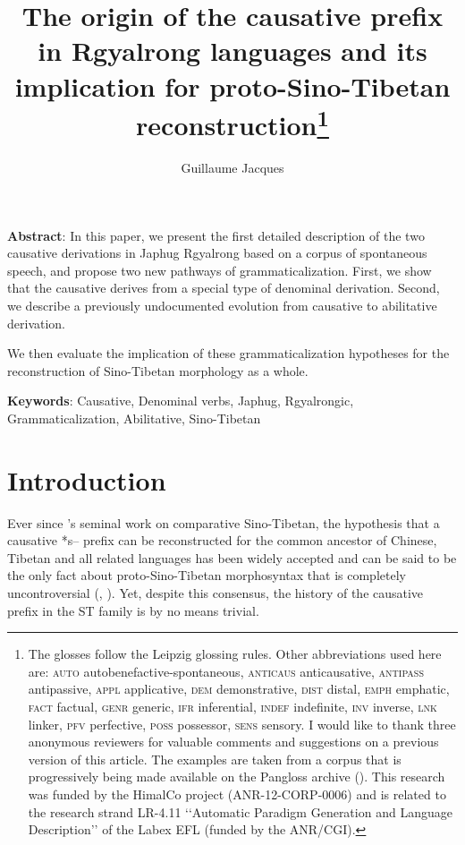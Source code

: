 \documentclass[oldfontcommands,oneside,a4paper,11pt]{article}
\begin{document}
 
\linenumbers
\title{The origin of the causative prefix in Rgyalrong languages and its implication for proto-Sino-Tibetan reconstruction\footnote{
The glosses follow the Leipzig glossing rules. Other abbreviations used here are: \textsc{auto}  autobenefactive-spontaneous, \textsc{anticaus} anticausative, \textsc{antipass} antipassive, \textsc{appl} applicative, \textsc{dem} demonstrative,  \textsc{dist} distal, \textsc{emph} emphatic, \textsc{fact} factual, \textsc{genr} generic, \textsc{ifr} inferential, \textsc{indef} indefinite, \textsc{inv} inverse,  \textsc{lnk} linker, \textsc{pfv} perfective, \textsc{poss} possessor,  \textsc{sens} sensory. I would like to thank three anonymous reviewers for valuable comments and suggestions on a previous version of this article. The examples are taken from a corpus that is progressively being made available on the Pangloss archive (\citealt{michailovsky14pangloss}). This research was funded by the HimalCo project (ANR-12-CORP-0006) and is related to the research strand LR-4.11 ‘‘Automatic Paradigm Generation and Language Description’’ of the Labex EFL (funded by the ANR/CGI). } }
\author{Guillaume Jacques}
\maketitle
\sloppy

\textbf{Abstract}: In this paper, we present the first detailed description of the two causative derivations in Japhug Rgyalrong based on a corpus of spontaneous speech, and propose two new pathways of grammaticalization. First, we show that the causative derives from a special type of denominal derivation. Second, we describe a previously undocumented evolution from causative to abilitative derivation. 

We then evaluate the implication of these grammaticalization hypotheses for the reconstruction of Sino-Tibetan morphology as a whole.

\textbf{Keywords}: Causative, Denominal verbs, Japhug, Rgyalrongic, Grammaticalization, Abilitative, Sino-Tibetan

\section{Introduction}

Ever since \citet{conrady1896}'s seminal work on comparative Sino-Tibetan, the hypothesis that a causative *s-- prefix can be reconstructed for the  common ancestor of Chinese, Tibetan and all related languages has been widely accepted and can be said to be the only fact about proto-Sino-Tibetan morphosyntax that is completely uncontroversial (\citealt{wolfenden29outlines, benedict72, matisoff03}, \citealt{lapolla03}).  Yet, despite this consensus, the history of the causative prefix in the ST family is by no means trivial. 
\end{document}
